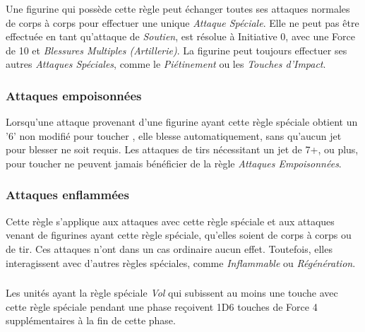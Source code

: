 Une figurine qui possède cette règle peut échanger toutes ses attaques normales de corps à corps pour effectuer une unique \emph{Attaque Spéciale}. Elle ne peut pas être effectuée en tant qu'attaque de \emph{Soutien}, est résolue à Initiative 0, avec une Force de 10 et \emph{Blessures Multiples (Artillerie)}.  La figurine peut toujours effectuer ses autres \emph{Attaques Spéciales}, comme le \emph{Piétinement} ou les \emph{Touches d'Impact}. 

\subsubsection*{Attaques empoisonnées}

Lorsqu'une attaque provenant d'une figurine ayant cette règle spéciale obtient un '6' non modifié pour toucher , elle blesse automatiquement, sans qu'aucun jet pour blesser ne soit requis. Les attaques de tirs nécessitant un jet de 7+, ou plus, pour toucher ne peuvent jamais bénéficier de la règle \emph{Attaques Empoisonnées}. 

\subsubsection*{Attaques enflammées}

Cette règle s'applique aux attaques avec cette règle spéciale et aux attaques venant de figurines ayant cette règle spéciale, qu'elles soient de corps à corps ou de tir. Ces attaques n'ont dans un cas ordinaire aucun effet. Toutefois, elles interagissent avec d'autres règles spéciales, comme \emph{Inflammable} ou \emph{Régénération}.

\subsubsection*{}

Les unités ayant la règle spéciale \emph{Vol} qui subissent au moins une touche avec cette règle spéciale pendant une phase reçoivent 1D6 touches de Force 4 supplémentaires à la fin de cette phase.

